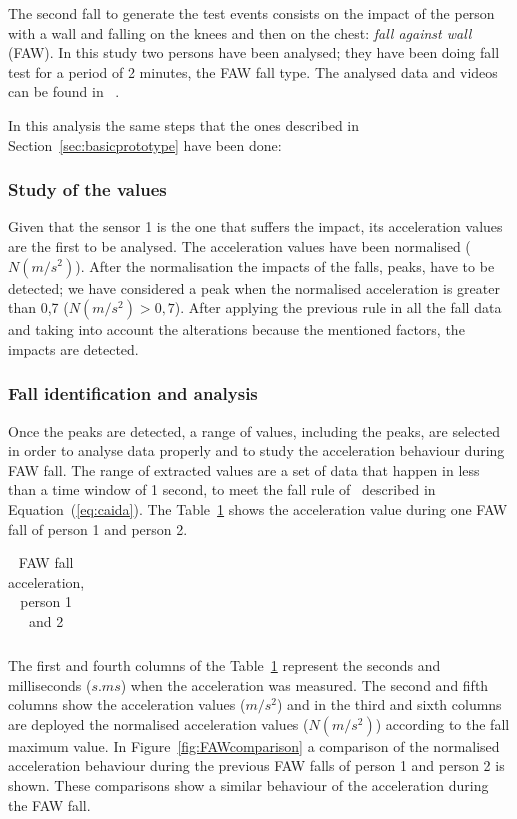 \documentclass[conference]{IEEEtran}
\theoremstyle{definition}
\begin{document}
The second fall to generate the test events consists on the impact of the person with 
a wall and falling on the knees and then on the chest: \textit{fall against wall} (FAW). 
In this study two persons have been analysed; they have been doing fall test for a period 
of 2 minutes, the FAW fall type. The analysed data and videos can be found in ~\cite{}.

In this analysis the same steps that the ones described in Section~\ref{sec:basicprototype} 
have been done:

\subsubsection*{Study of the values} Given that the sensor 1 is the one that suffers the 
impact, its acceleration values are the first to be analysed. The acceleration values have 
been normalised ($N(m/s^2)$). After the normalisation the impacts of the falls, peaks, 
have to be detected; we have considered a peak when the normalised acceleration is 
greater than 0,7 ($N(m/s^2) > 0,7$). After applying the previous rule in all the fall data 
and taking into account the alterations because the mentioned factors, the impacts are detected.

\subsubsection*{Fall identification and analysis} Once the peaks are detected, a range of values, 
including the peaks, are selected in order to analyse data properly and to study the acceleration 
behaviour during FAW fall. The range of extracted values are a set of data that happen in less 
than a time window of 1 second, to meet the fall rule of~\cite{Luder2009} described in 
Equation~(\ref{eq:caida}). The Table~\ref{tabla:FAW} shows the acceleration value during one FAW 
fall of person 1 and person 2. 

\begin{table}[!h]
 \centering
 \begin{tabular}{*{5}{r}}
   
 \end{tabular}
 \caption{FAW fall acceleration, person 1 and 2}%
 \label{tabla:FAW}
\end{table}

The first and fourth columns of the Table~\ref{tabla:FAW} represent the seconds and milliseconds 
($s.ms$) when the acceleration was measured. The second and fifth columns show the acceleration 
values ($m/s^2$) and in the third and sixth columns are deployed the normalised acceleration values 
($N(m/s^2)$) according to the fall maximum value. In Figure~\ref{fig:FAWcomparison} a comparison 
of the normalised acceleration behaviour during the previous FAW falls of person 1 and person 2 is 
shown. These comparisons show a similar behaviour of the acceleration during the FAW fall.
\end{document}
